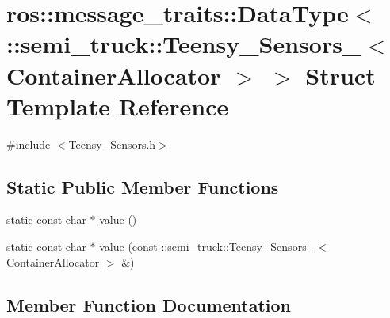 \hypertarget{structros_1_1message__traits_1_1_data_type_3_01_1_1semi__truck_1_1_teensy___sensors___3_01_container_allocator_01_4_01_4}{}\section{ros\+:\+:message\+\_\+traits\+:\+:Data\+Type$<$ \+:\+:semi\+\_\+truck\+:\+:Teensy\+\_\+\+Sensors\+\_\+$<$ Container\+Allocator $>$ $>$ Struct Template Reference}
\label{structros_1_1message__traits_1_1_data_type_3_01_1_1semi__truck_1_1_teensy___sensors___3_01_container_allocator_01_4_01_4}


{\ttfamily \#include $<$Teensy\+\_\+\+Sensors.\+h$>$}

\subsection*{Static Public Member Functions}
\begin{DoxyCompactItemize}
\item 
static const char $\ast$ \hyperlink{structros_1_1message__traits_1_1_data_type_3_01_1_1semi__truck_1_1_teensy___sensors___3_01_container_allocator_01_4_01_4_ae6fe8692452f07ae5b3e75e5d0ddd34e}{value} ()
\item 
static const char $\ast$ \hyperlink{structros_1_1message__traits_1_1_data_type_3_01_1_1semi__truck_1_1_teensy___sensors___3_01_container_allocator_01_4_01_4_aa312708edc222ddedc634b6124bf6688}{value} (const \+::\hyperlink{structsemi__truck_1_1_teensy___sensors__}{semi\+\_\+truck\+::\+Teensy\+\_\+\+Sensors\+\_\+}$<$ Container\+Allocator $>$ \&)
\end{DoxyCompactItemize}


\subsection{Member Function Documentation}
